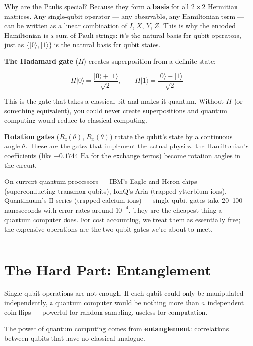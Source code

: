 \documentclass[
  11pt,
  oneside]{book}
\begin{document}
Why are the Paulis special? Because they form a \textbf{basis} for all
\(2 \times 2\) Hermitian matrices. Any single-qubit operator --- any
observable, any Hamiltonian term --- can be written as a linear
combination of \(I\), \(X\), \(Y\), \(Z\). This is why the encoded
Hamiltonian is a sum of Pauli strings: it's the natural basis for qubit
operators, just as \(\{\lvert 0\rangle, \lvert 1\rangle\}\) is the
natural basis for qubit states.

\textbf{The Hadamard gate} (\(H\)) creates superposition from a definite
state:

\[H\lvert 0\rangle = \frac{\lvert 0\rangle + \lvert 1\rangle}{\sqrt{2}}, \qquad H\lvert 1\rangle = \frac{\lvert 0\rangle - \lvert 1\rangle}{\sqrt{2}}\]

This is the gate that takes a classical bit and makes it quantum.
Without \(H\) (or something equivalent), you could never create
superpositions and quantum computing would reduce to classical
computing.

\textbf{Rotation gates} (\(R_z(\theta)\), \(R_x(\theta)\)) rotate the
qubit's state by a continuous angle \(\theta\). These are the gates that
implement the actual physics: the Hamiltonian's coefficients (like
\(-0.1744\) Ha for the exchange terms) become rotation angles in the
circuit.

On current quantum processors --- IBM's Eagle and Heron chips
(superconducting transmon qubits), IonQ's Aria (trapped ytterbium ions),
Quantinuum's H-series (trapped calcium ions) --- single-qubit gates take
20--100 nanoseconds with error rates around \(10^{-4}\). They are the
cheapest thing a quantum computer does. For cost accounting, we treat
them as essentially free; the expensive operations are the two-qubit
gates we're about to meet.

\begin{center}\rule{0.5\linewidth}{0.5pt}\end{center}

\section{The Hard Part: Entanglement}\label{the-hard-part-entanglement}

Single-qubit operations are not enough. If each qubit could only be
manipulated independently, a quantum computer would be nothing more than
\(n\) independent coin-flips --- powerful for random sampling, useless
for computation.

The power of quantum computing comes from \textbf{entanglement}:
correlations between qubits that have no classical analogue.
\end{document}
